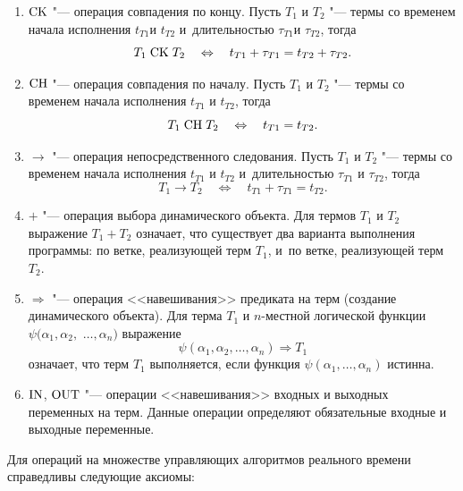 \begin{enumerate}
\item ${\rm CK}$ "--- операция совпадения по концу.
Пусть $T_1 $ и $T_2 $ "--- термы  со временем начала исполнения $t_{T1} $и $t_{T2} $
и~длительностью $\tau _{T1} $и $\tau _{T2} $,  тогда
\begin{equation}
\label{tyug:eq1}
T_1 \;{\rm CK}\;T_2 \quad \Leftrightarrow \quad  t_{T1} +\tau _{T1} =t_{T2} +\tau_{T2}.
\end{equation}

\item ${\rm CH}$ "--- операция совпадения по началу.
Пусть $T_1 $ и $T_2 $ "--- термы со временем начала исполнения $t_{T1} $ и $t_{T2}$,  тогда
\begin{equation}
\label{tyug:eq2}
T_1 \;{\rm CH}\;T_2 \quad \Leftrightarrow \quad t_{T1} =t_{T2} .
\end{equation}

\item $\to $ "--- операция непосредственного следования.
Пусть $T_1 $ и $T_2 $ "--- термы со временем начала исполнения $t_{T1} $ и $t_{T2} $
и~длительностью $\tau _{T1}$ и $\tau _{T2} $,  тогда
\begin{equation}
\label{tyug:eq3}
T_1 \to  T_2 \quad \Leftrightarrow \quad  t_{T1} +\tau _{T1} =t_{T2} .
\end{equation}

\item $+$ "--- операция выбора динамического объекта.
Для термов $T_1 $ и $T_2 $ выражение $T_1 +T_2 $ означает,  что существует два варианта выполнения программы:
по ветке,  реализующей терм $T_1$, и~по ветке,  реализующей терм $T_2 $.

\item $\Rightarrow $ "--- операция <<навешивания>> предиката на терм (создание динамического объекта).
Для терма $T_1 $ и $n$-местной логической функции $\psi (\alpha _1 , \alpha _2,$ $\dots, \alpha _n )$ выражение
\[
\psi (\alpha _1 , \alpha _2, \dots, \alpha _n )\Rightarrow T_1
\]
означает,  что терм $T_1 $ выполняется,  если функция $\psi (\alpha _1
,  \dots, \alpha _n )$ истинна.


\item $\rm IN$, $\rm OUT$ "--- операции <<навешивания>> входных и выходных переменных на терм. Данные операции определяют обязательные входные и выходные переменные.
\end{enumerate}

Для операций на множестве управляющих алгоритмов реального времени
справедливы следующие аксиомы:

